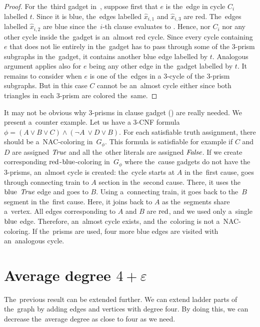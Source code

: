 \begin{proof}
	For the~third gadget in~,
	suppose first that $e$ is the~edge in cycle $C_i$ labelled $t$.
	Since it is blue, the~edges labelled $\hat{x}_{i,1}$ and $\hat{x}_{i,3}$ are red.
	The~edges labelled $\hat{x}_{i,2}$ are blue since the~$i$-th  clause evaluates to \true{}.
	Hence, nor $C_i$ nor any other cycle inside the~gadget is an~almost red cycle.
	Since every cycle containing $e$ that does not lie entirely in the~gadget
	has to pass through some of the 3-prism subgraphs in the~gadget, it contains another blue edge labelled by $t$.
	Analogous argument applies also for $e$ being any other edge in the~gadget labelled by $t$.
	It remains to consider when $e$ is one of the~edges in a 3-cycle of the 3-prism subgraphs.
	But in this case $C$ cannot be an~almost cycle either since both triangles in each 3-prism are colored the~same.
\end{proof}

It may not be obvious why 3-prisms in clause gadget
()
are really needed. We present a~counter example.
Let us have a 3-CNF formula~\( \phi = (A \lor B \lor C) \land (\lnot A~\lor D \lor B) \).
For each satisfiable truth assignment, there should be a~NAC-coloring in~\( G_\phi \).
%
This formula is satisfiable for example if \( C \) and \( D \) are assigned \( \textit{True} \)
and all the~other literals are assigned \( \textit{False} \).
If we create corresponding \( \text{red} \)-\( \text{blue} \)-coloring in~\( G_\phi \)
where the~cause gadgets do not have the 3-prisms, an~almost cycle is created:
%
the~cycle starts at \( A \) in the~first cause, goes through connecting
train to \( A \) section in the~second cause. There, it uses the~\( \text{blue} \)
\( \textit{True} \) edge and goes to \( B \). Using a~connecting train,
it goes back to the~\( B \) segment in the~first cause.
Here, it joins back to \( A \) as the~segments share a~vertex.
All edges corresponding to \( A \) and \( B \)
are \( \text{red} \), and we used only a~single \( \text{blue} \) edge.
Therefore, an~almost cycle exists, and the~coloring is not a~NAC-coloring.
If the~prisms are used, four more blue edges are visited with an~analogous cycle.


\section{Average degree \( 4 + \varepsilon \)}

The~previous result can be extended further.
We can extend ladder parts of the~graph by adding
edges and vertices with degree four.
By doing this, we can decrease the~average degree as close to four as we need.

